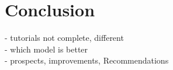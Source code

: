 \section{Conclusion}
- tutorials not complete, different \\
- which model is better \\
- prospects, improvements, Recommendations \\
